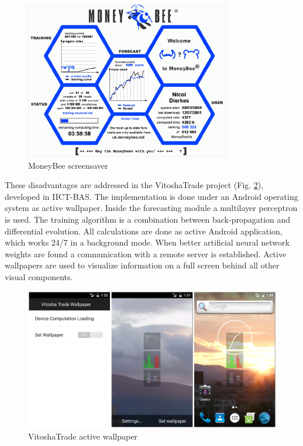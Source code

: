 \documentclass[runningheads]{llncs}
\begin{document}
\begin{figure}
\includegraphics[width=0.8\textwidth]{fig01.png}
\centering
\caption{MoneyBee screensaver} \label{fig01}
\end{figure}
\FloatBarrier

These disadvantages are addressed in the VitoshaTrade project (Fig. \ref{fig02}), developed in IICT-BAS. The implementation is done under an Android operating system as active wallpaper. Inside the forecasting module a multilayer perceptron is used. The training algorithm is a combination between back-propagation and differential evolution. All calculations are done as active Android application, which works 24/7 in a background mode. When better artificial neural network weights are found a communication with a remote server is established. Active wallpapers are used to visualize information on a full screen behind all other visual components. 

\begin{figure}
\includegraphics[width=1.0\textwidth]{fig02.png}
\centering
\caption{VitoshaTrade active wallpaper} \label{fig02}
\end{figure}
\FloatBarrier
\end{document}
